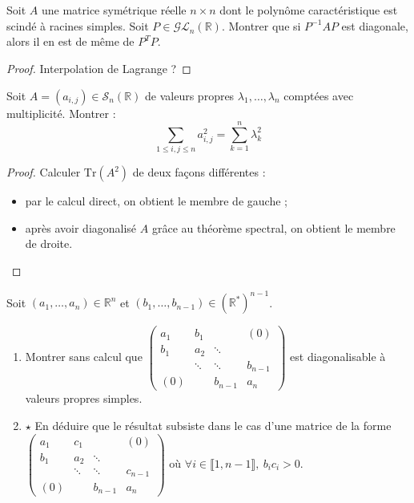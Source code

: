 \documentclass[french,a4paper]{article}
\newcommand{\R}{\mathbb{R}}
\newcommand{\st}{^*}
\newcommand{\inv}{^{-1}}
\newcommand{\Tr}{\text{Tr}}
\theoremstyle{plain}
\theoremstyle{definition}
\theoremstyle{remark}
\begin{document}
\begin{ex}{}
	Soit $A$ une matrice symétrique réelle $n\times n$ dont le polynôme caractéristique est scindé à racines simples. Soit $P\in\mathcal{GL}_n(\R)$. Montrer que si $P\inv AP$ est diagonale, alors il en est de même de $P^TP$.
\end{ex}
\begin{proof}
	Interpolation de Lagrange ?
\end{proof}

\begin{ex}{}
	Soit $A=(a_{i,j})\in\mathcal{S}_n(\R)$ de valeurs propres $\lambda_1,\ldots,\lambda_n$ comptées avec multiplicité. Montrer : $$\sum_{1\leqslant i,j\leqslant n}a_{i,j}^2=\sum_{k=1}^{n}\lambda_k^2$$
\end{ex}
\begin{proof}
	Calculer $\Tr(A^2)$ de deux façons différentes :
	\begin{itemize}
		\item par le calcul direct, on obtient le membre de gauche ;
		\item après avoir diagonalisé $A$ grâce au théorème spectral, on obtient le membre de droite.
	\end{itemize}
\end{proof}

\begin{ex}{}
	Soit $(a_1,\ldots,a_n)\in\R^n$ et $(b_1,\ldots,b_{n-1})\in(\R\st)^{n-1}$.
	\begin{enumerate}
		\item Montrer sans calcul que $\displaystyle\begin{pmatrix}
			a_1&b_1&&(0)\\
			b_1&a_2&\ddots&\\
			&\ddots&\ddots&b_{n-1}\\
			(0)&&b_{n-1}&a_n
		\end{pmatrix}$ est diagonalisable à valeurs propres simples.
		\item $\star$ En déduire que le résultat subsiste dans le cas d'une matrice de la forme $\displaystyle\begin{pmatrix}
			a_1&c_1&&(0)\\
			b_1&a_2&\ddots&\\
			&\ddots&\ddots&c_{n-1}\\
			(0)&&b_{n-1}&a_n
		\end{pmatrix}$ où $\forall i\in\llbracket1,n-1\rrbracket,\ b_ic_i>0$.
	\end{enumerate}
\end{ex}
\end{document}

